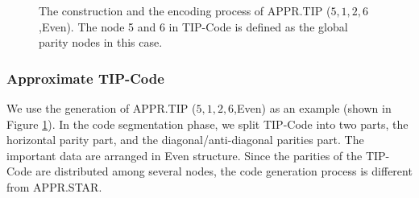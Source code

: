 \documentclass[sigconf]{acmart}
\begin{document}
\begin{figure}[ht]
\vspace{-3mm}
\caption{The construction and the encoding process of APPR.TIP ($5,1,2,6$,Even). The node 5 and 6 in TIP-Code is defined as the global parity nodes in this case.}\label{fig-ap-TIP}
\vspace{-3mm}
\end{figure}

\subsubsection{Approximate TIP-Code}

We use the generation of APPR.TIP ($5,1,2,6$,Even) as an example (shown in Figure \ref{fig-ap-TIP}). In the code segmentation phase, we split TIP-Code into two parts, the horizontal parity part, and the diagonal/anti-diagonal parities part. The important data are arranged in Even structure. Since the parities of the TIP-Code are distributed among several nodes, the code generation process is different from APPR.STAR.
\end{document}
